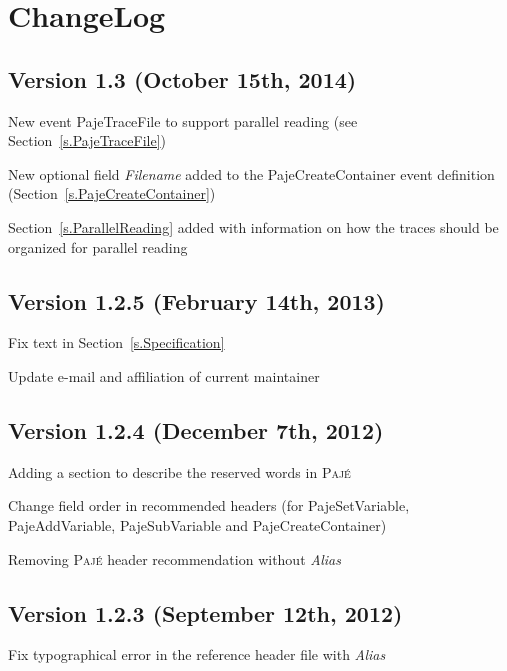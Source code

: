 \documentclass[12pt]{article}
\newcommand{\Paje}{\textsc{Paj\'e}\xspace}
\newcommand{\PajeField}[1]{\emph{#1}\xspace}
\newcommand{\Alias}{\PajeField{Alias}}
\newcommand{\Filename}{\PajeField{Filename}}
\newcommand{\PajeEvent}[1]{\textsf{#1}\xspace}
\newcommand{\PajeCreateContainer}{\PajeEvent{PajeCreateContainer}}
\newcommand{\PajeSetVariable}{\PajeEvent{PajeSetVariable}}
\newcommand{\PajeAddVariable}{\PajeEvent{PajeAddVariable}}
\newcommand{\PajeSubVariable}{\PajeEvent{PajeSubVariable}}
\newcommand{\PajeTraceFile}{\PajeEvent{PajeTraceFile}}
\newenvironment{itemize*}%
               {\vspace{-1em}
                 \begin{itemize}%
                   \setlength{\itemsep}{0pt}%
                   \setlength{\parskip}{0pt}}%
               {\end{itemize}}
\begin{document}
\section{ChangeLog}
\label{ChangeLog}

\subsection*{Version 1.3 (October 15th, 2014)}
\begin{itemize*}
\item New event \PajeTraceFile to support parallel reading (see Section~\ref{s.PajeTraceFile})
\item New optional field \Filename added to the \PajeCreateContainer event definition (Section~\ref{s.PajeCreateContainer})
\item Section~\ref{s.ParallelReading} added with information on how the traces should be organized for parallel reading
\end{itemize*}

\subsection*{Version 1.2.5 (February 14th, 2013)}
\begin{itemize*}
\item Fix text in Section~\ref{s.Specification}
\item Update e-mail and affiliation of current maintainer
\end{itemize*}

\subsection*{Version 1.2.4 (December 7th, 2012)}
\begin{itemize*}
\item Adding a section to describe the reserved words in \Paje
\item Change field order in recommended headers (for \PajeSetVariable,
  \PajeAddVariable, \PajeSubVariable and \PajeCreateContainer)
\item Removing \Paje header recommendation without \Alias
\end{itemize*}

\subsection*{Version 1.2.3 (September 12th, 2012)}
\begin{itemize*}
\item Fix typographical error in the reference header file with \Alias
\end{itemize*}
\end{document}
